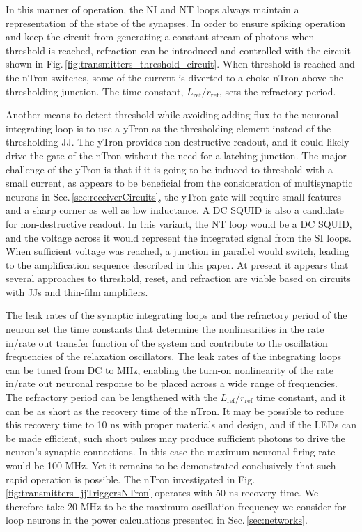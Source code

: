 \documentclass[twocolumn]{article}
\begin{document}
In this manner of operation, the NI and NT loops always maintain a representation of the state of the synapses. In order to ensure spiking operation and keep the circuit from generating a constant stream of photons when threshold is reached, refraction can be introduced and controlled with the circuit shown in Fig.\,\ref{fig:transmitters_threshold_circuit}. When threshold is reached and the nTron switches, some of the current is diverted to a choke nTron above the thresholding junction. The time constant, $L_{\mathrm{ref}}/r_{\mathrm{ref}}$, sets the refractory period.

Another means to detect threshold while avoiding adding flux to the neuronal integrating loop is to use a yTron \cite{mcab2016} as the thresholding element instead of the thresholding JJ. The yTron provides non-destructive readout, and it could likely drive the gate of the nTron without the need for a latching junction. The major challenge of the yTron is that if it is going to be induced to threshold with a small current, as appears to be beneficial from the consideration of multisynaptic neurons in Sec.\,\ref{sec:receiverCircuits}, the yTron gate will require small features and a sharp corner \cite{mcab2016} as well as low inductance. A DC SQUID \cite{ti1996,vatu1998,ka1999} is also a candidate for non-destructive readout. In this variant, the NT loop would be a DC SQUID, and the voltage across it would represent the integrated signal from the SI loops. When sufficient voltage was reached, a junction in parallel would switch, leading to the amplification sequence described in this paper. At present it appears that several approaches to threshold, reset, and refraction are viable based on circuits with JJs and thin-film amplifiers.

The leak rates of the synaptic integrating loops and the refractory period of the neuron set the time constants that determine the nonlinearities in the rate in/rate out transfer function of the system and contribute to the oscillation frequencies of the relaxation oscillators. The leak rates of the integrating loops can be tuned from DC to MHz, enabling the turn-on nonlinearity of the rate in/rate out neuronal response to be placed across a wide range of frequencies. The refractory period can be lengthened with the $L_{\mathrm{ref}}/r_{\mathrm{ref}}$ time constant, and it can be as short as the recovery time of the nTron. It may be possible to reduce this recovery time to 10 ns with proper materials and design, and if the LEDs can be made efficient, such short pulses may produce sufficient photons to drive the neuron's synaptic connections. In this case the maximum neuronal firing rate would be 100 MHz. Yet it remains to be demonstrated conclusively that such rapid operation is possible. The nTron investigated in Fig.\,\ref{fig:transmitters_jjTriggersNTron} operates with 50 ns recovery time. We therefore take 20 MHz to be the maximum oscillation frequency we consider for loop neurons in the power calculations presented in Sec.\,\ref{sec:networks}.
	
\end{document}
